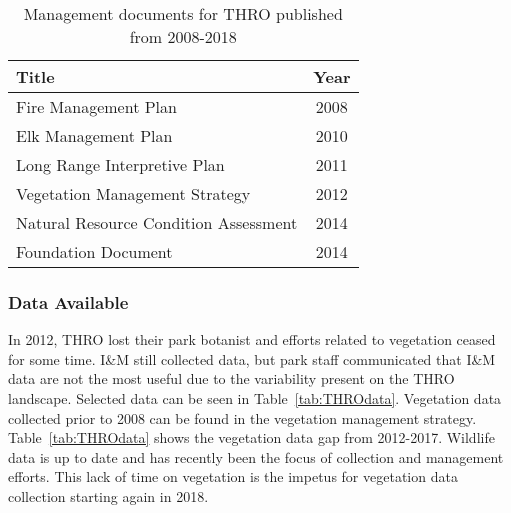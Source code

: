 \begin{table}[h]
	\centering
\caption[THRO management documents]
	{Management documents for THRO published from 2008-2018}
\label{tab:THROmandocs}
\begin{tabular}{lc}
	\toprule
	Title & Year\tabularnewline
	\midrule
	Fire Management Plan & 2008 \tabularnewline
	Elk Management Plan  & 2010 \tabularnewline
	Long Range Interpretive Plan & 2011 \tabularnewline
	Vegetation Management Strategy & 2012 \tabularnewline
	Natural Resource Condition Assessment & 2014\tabularnewline
	Foundation Document & 2014 \tabularnewline
	\bottomrule
\end{tabular}
\end{table}

\subsubsection{Data Available}

In 2012, THRO lost their park botanist and efforts related to vegetation ceased for some time. 
I\&M still collected data, but park staff communicated that I\&M data are not the most useful due to the variability present on the THRO landscape. 
Selected data can be seen in Table~\ref{tab:THROdata}. 
Vegetation data collected prior to 2008 can be found in the vegetation management strategy. 
Table~\ref{tab:THROdata} shows the vegetation data gap from 2012-2017. 
Wildlife data is up to date and has recently been the focus of collection and management efforts. 
This lack of time on vegetation is the impetus for vegetation data collection
starting again in 2018.


